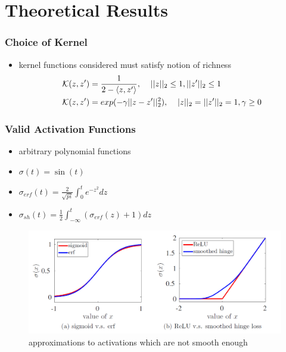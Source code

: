 \documentclass[hyperref={colorlinks}]{beamer}
\begin{document}
\section{Theoretical Results}
\begin{frame}
	\frametitle{Choice of Kernel}
	\begin{itemize}
		\item kernel functions considered must satisfy notion of richness
		\begin{align*}
			&\mathcal{K}(z,z')=\frac{1}{2-\langle z,z' \rangle}, \hspace{4mm} ||z||_2\leq 1, ||z'||_2\leq 1 \\
			&\mathcal{K}(z,z')=exp(-\gamma||z-z'||_2^2), \hspace{4mm} |z||_2=||z'||_2 =1, \gamma\geq0
		\end{align*}
	\end{itemize}
\end{frame}
\begin{frame}
	\frametitle{Valid Activation Functions}
	\begin{itemize}
		\item arbitrary polynomial functions
		\item $\sigma(t)=\sin(t)$
		\item $\sigma_{erf}(t)=\frac{2}{\sqrt{pi}}\int_{0}^{t}e^{-z^2}dz$
		\item $\sigma_{sh}(t)=\frac{1}{2}\int_{-\infty}^{t}(\sigma_{erf}(z)+1)dz$
	\end{itemize}
	\begin{figure}
		\includegraphics[scale=0.4]{Valid-Activation.png}
		\caption{approximations to activations which are not smooth enough}
		\label{fig:valid-activation}
	\end{figure}
\end{frame}
\end{document}
